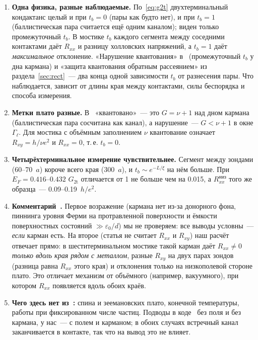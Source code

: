 \documentclass[11pt,a4paper]{article}
\newcommand{\tb}{t_b}
\newcommand{\he}{h/e^2}
\newcommand{\Rxy}{R_{xy}}
\newcommand{\Rxx}{R_{xx}}
\newcommand{\EF}{E_F}
\begin{document}
\begin{enumerate}
\item \textbf{Одна физика, разные наблюдаемые.} По~\eqref{eq:g2t}
  двухтерминальный кондактанс целый и при $\tb=0$ (пары как будто нет), и
  при $\tb=1$ (баллистическая пара считается ещё одним каналом); виден только
  промежуточный $\tb$. В мостике $\tb$ каждого сегмента между соседними
  контактами даёт $\Rxx$ и разницу холловских напряжений, а $\tb=1$
  даёт \emph{максимальное} отклонение. «Нарушение квантования»
  в~\cite{andolina} (промежуточный $\tb$ у дна кармана) и «защита квантования
  обратным рассеянием» из раздела~\ref{sec:rect}~--- два конца одной
  зависимости $\tb$ от разнесения пары. Что наблюдается, зависит от длины
  края между контактами, силы беспорядка и способа измерения.
\item \textbf{Метки плато разные.} В~\cite{andolina} «квантовано»~--- это
  $G=\nu+1$ над дном кармана (баллистическая пара сосчитана как канал), а
  нарушение~--- $G<\nu+1$ в окне $\Gamma_\ell$. Для мостика с объёмным
  заполнением $\nu$ квантование означает $\Rxy=h/\nu e^2$ и $\Rxx=0$, т.\,е.
  $\tb=0$.
\item \textbf{Четырёхтерминальное измерение чувствительнее.} Сегмент между
  зондами (60--70~$a$) короче всего края (300~$a$), и $\tb\sim e^{-L/\xi}$ на
  нём больше. При $\EF=0.416$--$0.432$ $G_\text{2t}$ отличается от 1 не
  больше чем на 0.015, а $\Rxx^\text{низ}$ того же образца~--- 0.09--0.19~$\he$.
\item \textbf{Комментарий~\cite{ciuti}.} Первое возражение (кармана нет
  из-за донорного фона, пиннинга уровня Ферми на протравленной поверхности и
  ёмкости поверхностных состояний $\gg\varepsilon_0/d$) мы не проверяем: все
  выводы условны~--- \emph{если} карман есть. На второе (статья не считает
  $\Rxx$ и $\Rxy$) наш расчёт отвечает прямо: в шеститерминальном мостике
  такой карман даёт $\Rxx\neq0$ \emph{только вдоль края рядом с металлом},
  разные $\Rxy$ на двух парах зондов (разница равна $\Rxx$ этого края) и
  отклонения только на низкополевой стороне плато. Это отличает механизм от
  объёмного (например, вакуумного), при котором $\Rxx$ появляется вдоль обоих
  краёв.
\item \textbf{Чего здесь нет из~\cite{andolina}:} спина и зеемановских
  плато, конечной температуры, работы при фиксированном числе частиц.
  Подводы в коде~\cite{andolina} без поля и без кармана, у нас~--- с полем и
  карманом; в обоих случаях встречный канал заканчивается в контакте, так что
  на вывод это не влияет.
\end{enumerate}
\end{document}
